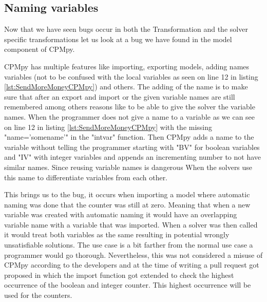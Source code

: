 %
%

\subsection{Naming variables}
\label{res:bug:Naming+andImport}
Now that we have seen bugs occur in both the Transformation and the solver specific transformations let us look at a bug we have found in the model component of CPMpy. 

CPMpy has multiple features like importing, exporting models, adding names variables (not to be confused with the local variables as seen on line 12 in listing \ref{lst:SendMoreMoneyCPMpy}) and others. The adding of the name is to make sure that after an export and import or the given variable names are still remembered among others reasons like to be able to give the solver the variable names. When the programmer does not give a name to a variable as we can see on line 12 in listing \ref{lst:SendMoreMoneyCPMpy} with the missing "name='somename'" in the "intvar" function. Then CPMpy adds a name to the variable without telling the programmer starting with "BV" for boolean variables and "IV" with integer variables and appends an incrementing number to not have similar names. Since reusing variable names is dangerous When the solvers use this name to differentiate variables from each other.

This brings us to the bug, it occurs when importing a model where automatic naming was done that the counter was still at zero. Meaning that when a new variable was created with automatic naming it would have an overlapping variable name with a variable that was imported. When a solver was then called it would treat both variables as the same resulting in potential wrongly unsatisfiable solutions. The use case is a bit farther from the normal use case a programmer would go thorough. Nevertheless, this was not considered a misuse of CPMpy according to the developers and at the time of writing a pull request got proposed in which the import function got extended to check the highest occurrence of the boolean and integer counter. This highest occurrence will be used for the counters.

